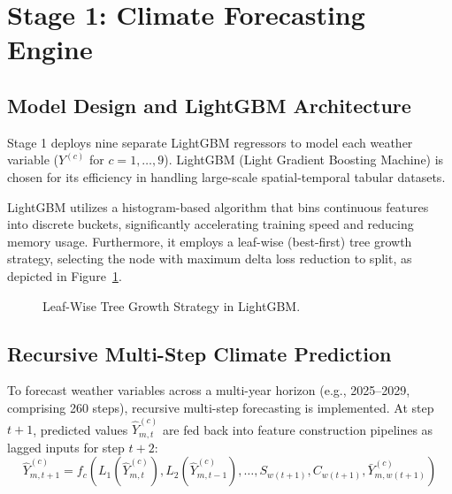 \documentclass[journal,onecolumn,11pt]{IEEEtran}
\begin{document}
\section{Stage 1: Climate Forecasting Engine}

\subsection{Model Design and LightGBM Architecture}
Stage 1 deploys nine separate LightGBM regressors to model each weather variable ($Y^{(c)}$ for $c=1,\dots,9$). LightGBM (Light Gradient Boosting Machine) is chosen for its efficiency in handling large-scale spatial-temporal tabular datasets.

LightGBM utilizes a histogram-based algorithm that bins continuous features into discrete buckets, significantly accelerating training speed and reducing memory usage. Furthermore, it employs a leaf-wise (best-first) tree growth strategy, selecting the node with maximum delta loss reduction to split, as depicted in Figure~\ref{fig:tree_growth}.

\begin{figure}[h!]
\centering
{}
\caption{Leaf-Wise Tree Growth Strategy in LightGBM.}
\label{fig:tree_growth}
\end{figure}

\subsection{Recursive Multi-Step Climate Prediction}
To forecast weather variables across a multi-year horizon (e.g., 2025--2029, comprising 260 steps), recursive multi-step forecasting is implemented. At step $t+1$, predicted values $\hat{Y}^{(c)}_{m,t}$ are fed back into feature construction pipelines as lagged inputs for step $t+2$:
\begin{equation}
    \hat{Y}^{(c)}_{m,t+1} = f_c\left( L_1(\hat{Y}^{(c)}_{m,t}), L_2(\hat{Y}^{(c)}_{m,t-1}), \dots, S_{w(t+1)}, C_{w(t+1)}, \bar{Y}^{(c)}_{m,w(t+1)} \right)
\end{equation}
\end{document}
